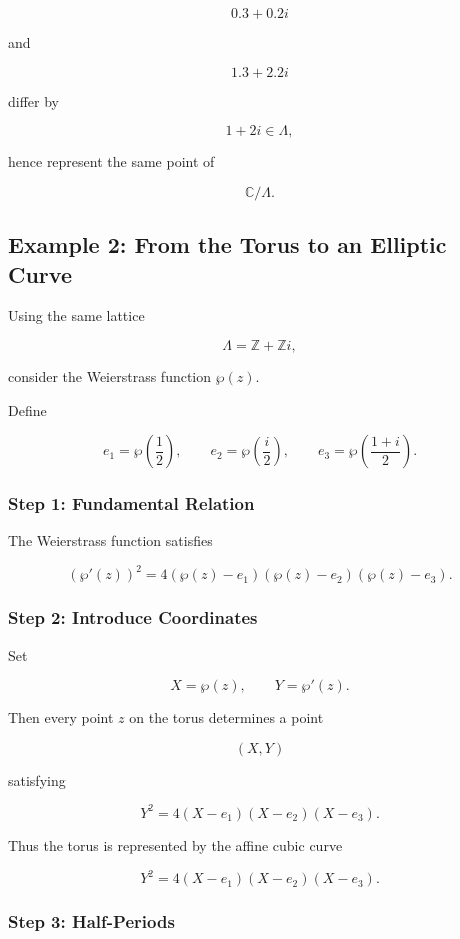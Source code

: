 \documentclass[12pt,a4paper]{article}
\theoremstyle{notespace}
\begin{document}
\[
0.3+0.2i
\]

and

\[
1.3+2.2i
\]

differ by

\[
1+2i\in\Lambda,
\]

hence represent the same point of

\[
\mathbb C/\Lambda.
\]

\bigskip

\subsection{Example 2: From the Torus to an Elliptic Curve}

Using the same lattice

\[
\Lambda=\mathbb Z+\mathbb Zi,
\]

consider the Weierstrass function \(\wp(z)\).

Define

\[
e_1=
\wp\!\left(\frac12\right),
\qquad
e_2=
\wp\!\left(\frac{i}{2}\right),
\qquad
e_3=
\wp\!\left(\frac{1+i}{2}\right).
\]

\subsubsection*{Step 1: Fundamental Relation}

The Weierstrass function satisfies

\[
(\wp'(z))^2
=
4(\wp(z)-e_1)
(\wp(z)-e_2)
(\wp(z)-e_3).
\]

\subsubsection*{Step 2: Introduce Coordinates}

Set

\[
X=\wp(z),
\qquad
Y=\wp'(z).
\]

Then every point \(z\) on the torus determines a point

\[
(X,Y)
\]

satisfying

\[
Y^2
=
4(X-e_1)(X-e_2)(X-e_3).
\]

Thus the torus is represented by the affine cubic curve

\[
\boxed{
	Y^2
	=
	4(X-e_1)(X-e_2)(X-e_3).
}
\]

\subsubsection*{Step 3: Half-Periods}
\end{document}
